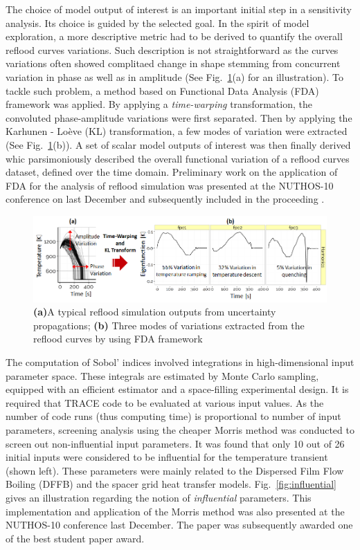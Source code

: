 \documentclass[11pt,titlepage]{article}
\begin{document}
The choice of model output of interest is an important initial step in a sensitivity analysis. Its choice is guided by the selected goal.
In the spirit of model exploration, a more descriptive metric had to be derived to quantify the overall reflood curves variations.
Such description is not straightforward as the curves variations often showed complitaed change in shape stemming from concurrent variation in phase as well as in amplitude (See Fig.~\ref{fig:output}(a) for an illustration).
To tackle such problem, a method based on Functional Data Analysis (FDA) framework was applied.
By applying a \emph{time-warping} transformation, the convoluted phase-amplitude variations were first separated. Then by applying the Karhunen - Lo\`eve (KL) transformation, a few modes of variation were extracted (See Fig.~\ref{fig:output}(b)).
A set of scalar model outputs of interest was then finally derived whic parsimoniously described the overall functional variation of a reflood curves dataset, defined over the time domain.
Preliminary work on the application of FDA for the analysis of reflood simulation was presented at the NUTHOS-10 conference on last December and subsequently included in the proceeding \cite{Wicaksono2014a}.

\begin{figure}[h!]
	\centering
		\includegraphics[width=\textwidth]{figures/modelOutputsOfInterest.png}
	\caption{\textbf{(a)}A typical reflood simulation outputs from uncertainty propagations; \textbf{(b)} Three modes of variations extracted from the reflood curves by using FDA framework}
	\label{fig:output}
\end{figure}

The computation of Sobol' indices involved integrations in high-dimensional input parameter space.
These integrals are estimated by Monte Carlo sampling, equipped with an efficient estimator and a space-filling experimental design.
It is required that TRACE code to be evaluated at various input values.
As the number of code runs (thus computing time) is proportional to number of input parameters, screening analysis using the cheaper Morris method was conducted to screen out non-influential input parameters. It was found that only 10 out of 26 initial inputs were considered to be influential for the temperature transient (shown left). 
These parameters were mainly related to the Dispersed Film Flow Boiling (DFFB) and the spacer grid heat transfer models.
Fig.~\ref{fig:influential} gives an illustration regarding the notion of \emph{influential} parameters.
This implementation and application of the Morris method was also presented at the NUTHOS-10 conference last December\cite{Wicaksono2014b}.
The paper was subsequently awarded one of the best student paper award.
\end{document}
